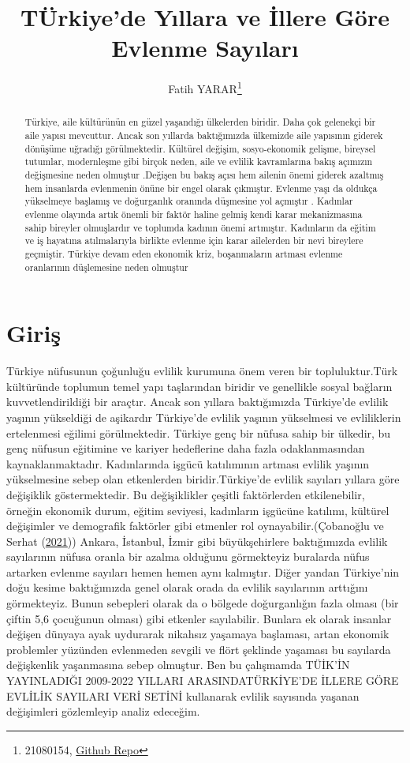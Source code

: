 \documentclass[
  12pt,
]{article}
\title{TÜrkiye'de Yıllara ve İllere Göre Evlenme Sayıları}
\author{Fatih YARAR\footnote{21080154, \href{https://github.com/fatihyrr/final}{Github Repo}}}
\date{}
\begin{document}
\maketitle
\begin{abstract}
Türkiye, aile kültürünün en güzel yaşandığı ülkelerden biridir. Daha çok gelenekçi bir aile yapısı mevcuttur. Ancak son yıllarda baktığımızda ülkemizde aile yapısının giderek dönüşüme uğradığı görülmektedir. Kültürel değişim, sosyo-ekonomik gelişme, bireysel tutumlar, modernleşme gibi birçok neden, aile ve evlilik kavramlarına bakış açımızın değişmesine neden olmuştur .Değişen bu bakış açısı hem ailenin önemi giderek azaltmış hem insanlarda evlenmenin önüne bir engel olarak çıkmıştır. Evlenme yaşı da oldukça yükselmeye başlamış ve doğurganlık oranında düşmesine yol açmıştır . Kadınlar evlenme olayında artık önemli bir faktör haline gelmiş kendi karar mekanizmasına sahip bireyler olmuşlardır ve toplumda kadının önemi artmıştır. Kadınların da eğitim ve iş hayatına atılmalarıyla birlikte evlenme için karar ailelerden bir nevi bireylere geçmiştir. Türkiye devam eden ekonomik kriz, boşanmaların artması evlenme oranlarının düşlemesine neden olmuştur
\end{abstract}

\hypertarget{giriux15f}{%
\section{Giriş}\label{giriux15f}}

Türkiye nüfusunun çoğunluğu evlilik kurumuna önem veren bir topluluktur.Türk kültüründe toplumun temel yapı taşlarından biridir ve genellikle sosyal bağların kuvvetlendirildiği bir araçtır. Ancak son yıllara baktığımızda Türkiye'de evlilik yaşının yükseldiği de aşikardır Türkiye'de evlilik yaşının yükselmesi ve evliliklerin ertelenmesi eğilimi görülmektedir. Türkiye genç bir nüfusa sahip bir ülkedir, bu genç nüfusun eğitimine ve kariyer hedeflerine daha fazla odaklanmasından kaynaklanmaktadır. Kadınlarında işgücü katılımının artması evlilik yaşının yükselmesine sebep olan etkenlerden biridir.Türkiye'de evlilik sayıları yıllara göre değişiklik göstermektedir. Bu değişiklikler çeşitli faktörlerden etkilenebilir, örneğin ekonomik durum, eğitim seviyesi, kadınların işgücüne katılımı, kültürel değişimler ve demografik faktörler gibi etmenler rol oynayabilir.(Çobanoğlu ve Serhat (\protect\hyperlink{ref-ccobanouglu2021turkiye}{2021})) Ankara, İstanbul, İzmir gibi büyükşehirlere baktığımızda evlilik sayılarının nüfusa oranla bir azalma olduğunu görmekteyiz buralarda nüfus artarken evlenme sayıları hemen hemen aynı kalmıştır. Diğer yandan Türkiye'nin doğu kesime baktığımızda genel olarak orada da evlilik sayılarının arttığını görmekteyiz. Bunun sebepleri olarak da o bölgede doğurganlığın fazla olması (bir çiftin 5,6 çocuğunun olması) gibi etkenler sayılabilir. Bunlara ek olarak insanlar değişen dünyaya ayak uydurarak nikahsız yaşamaya başlaması, artan ekonomik problemler yüzünden evlenmeden sevgili ve flört şeklinde yaşaması bu sayılarda değişkenlik yaşanmasına sebep olmuştur. Ben bu çalışmamda TÜİK'İN YAYINLADIĞI 2009-2022 YILLARI ARASINDATÜRKİYE'DE İLLERE GÖRE EVLİLİK SAYILARI VERİ SETİNİ kullanarak evlilik sayısında yaşanan değişimleri gözlemleyip analiz edeceğim.
\end{document}
